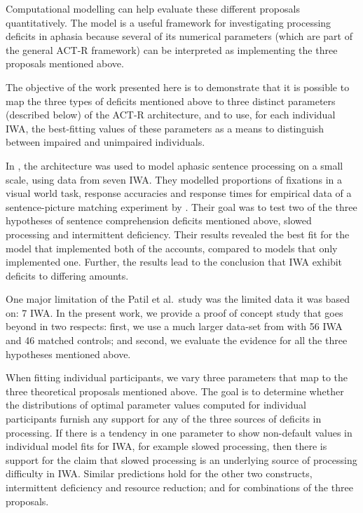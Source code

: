 \documentclass{cambridge7A}\usepackage[]{graphicx}\usepackage[]{color}
\begin{document}
Computational modelling can help evaluate these different proposals quantitatively. The \cite{LewisVasishth2005} model is a useful framework for investigating processing deficits in aphasia because several of its numerical parameters (which are part of the general ACT-R framework) can be interpreted as implementing the three proposals mentioned above.

The objective of the work presented here is to demonstrate that it is possible to map the three types of deficits mentioned above to three distinct parameters (described below) of the ACT-R architecture, and to use, for each individual IWA, the best-fitting values of these parameters as a means to distinguish between impaired and unimpaired individuals.

In \cite{PatilEtAl2016}, the \cite{LewisVasishth2005} architecture was used to model aphasic sentence processing on a small scale, using data from seven IWA. 
They modelled proportions of fixations in a visual world task, response accuracies and response times for empirical data of a sentence-picture matching experiment by \cite{hanneetal11}. Their goal was to test two of the three hypotheses of sentence comprehension deficits mentioned above, slowed processing and intermittent deficiency.  
Their results revealed the best fit for the model that implemented both of the accounts, compared to models that only implemented one. Further, the results lead to the conclusion that IWA exhibit deficits to differing amounts.

One major limitation of the Patil et al.\ study was the limited data it was based on: 7 IWA.
In the present work, we provide a proof of concept study that goes beyond \cite{PatilEtAl2016} in two respects: first, we use a much larger data-set from \cite{CaplanEtAl2015} with 56 IWA and 46 matched controls; and second, we evaluate the evidence for all the three hypotheses mentioned above. 

When fitting individual participants, we vary three parameters that map to the three theoretical proposals mentioned above. The goal is to determine whether the distributions of optimal parameter values computed for individual participants furnish any support for any of the three sources of deficits in processing. If there is a tendency in one parameter to show non-default values in individual model fits for IWA, for example slowed processing,
then there is support for the claim that slowed processing is an underlying source of processing difficulty in IWA. Similar predictions hold for the other two constructs, intermittent deficiency and resource reduction; and for combinations of the three proposals.
\end{document}
